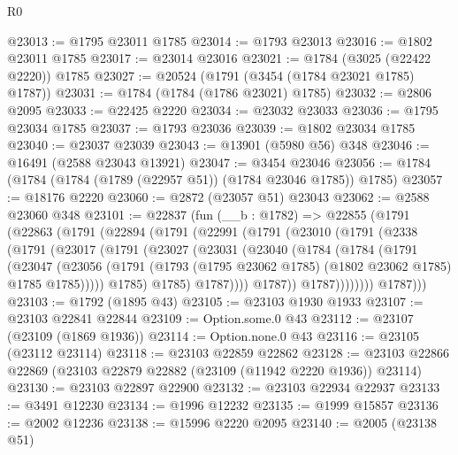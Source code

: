 \begin{lexlean}{R0}
\begin{coremodule}
@23013 := @1795 @23011 @1785
@23014 := @1793 @23013
@23016 := @1802 @23011 @1785
@23017 := @23014 @23016
@23021 := @1784 (@3025 (@22422 @2220)) @1785
@23027 := @20524 (@1791 (@3454 (@1784 @23021 @1785) @1787))
@23031 := @1784 (@1784 (@1786 @23021) @1785)
@23032 := @2806 @2095
@23033 := @22425 @2220
@23034 := @23032 @23033
@23036 := @1795 @23034 @1785
@23037 := @1793 @23036
@23039 := @1802 @23034 @1785
@23040 := @23037 @23039
@23043 := @13901 (@5980 @56) @348
@23046 := @16491 (@2588 @23043 @13921)
@23047 := @3454 @23046
@23056 := @1784 (@1784 (@1784 (@1789 (@22957 @51)) (@1784 @23046 @1785)) @1785)
@23057 := @18176 @2220
@23060 := @2872 (@23057 @51) @23043
@23062 := @2588 @23060 @348
@23101 := @22837
    (fun (__b : @1782) =>
    @22855
      (@1791
        (@22863
          (@1791
            (@22894
              (@1791
                (@22991
                  (@1791
                    (@23010
                      (@1791
                        (@2338
                          (@1791
                            (@23017
                              (@1791
                                (@23027
                                  (@23031
                                    (@23040
                                      (@1784
                                        (@1784
                                          (@1791
                                            (@23047
                                              (@23056
                                                (@1791
                                                  (@1793
                                                    (@1795 @23062 @1785)
                                                    (@1802 @23062 @1785)
                                                    @1785
                                                    @1785)))))
                                          @1785)
                                        @1785)
                                      @1787))))
                              @1787))
                          @1787))))))))
          @1787)))
@23103 := @1792 (@1895 @43)
@23105 := @23103 @1930 @1933
@23107 := @23103 @22841 @22844
@23109 := Option.some.{0} @43
@23112 := @23107 (@23109 (@1869 @1936))
@23114 := Option.none.{0} @43
@23116 := @23105 (@23112 @23114)
@23118 := @23103 @22859 @22862
@23128 := @23103 @22866 @22869 (@23103 @22879 @22882 (@23109 (@11942 @2220 @1936)) @23114)
@23130 := @23103 @22897 @22900
@23132 := @23103 @22934 @22937
@23133 := @3491 @12230
@23134 := @1996 @12232
@23135 := @1999 @15857
@23136 := @2002 @12236
@23138 := @15996 @2220 @2095
@23140 := @2005 (@23138 @51)

\end{coremodule}
\end{lexlean}
